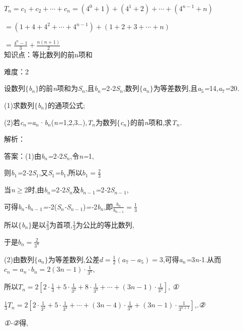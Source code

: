 \documentclass{article} %
\begin{document}
$T_n=c_1+c_2+\cdots+c_n=(4^0+1)+(4^1+2)+\cdots+(4^{n-1}+n)$

$=(1+4+4^2+\cdots+4^{n-1})+(1+2+3+\cdots+n)$

$=\frac{4^n-1}{3}+\frac{n(n+1)}{2}$ \\

知识点：等比数列的前n项和

难度：2

 设数列$\mathrm{\{}$\textit{b${}_{n}$}$\mathrm{\}}$的前\textit{n}项和为\textit{S${}_{n}$},且\textit{b${}_{n}$=}2\textit{-}2\textit{S${}_{n}$},数列$\mathrm{\{}$\textit{a${}_{n}$}$\mathrm{\}}$为等差数列,且\textit{a}${}_{5}$\textit{=}14,\textit{a}${}_{7}$\textit{=}20\textit{.}

 (1)求数列$\mathrm{\{}$\textit{b${}_{n}$}$\mathrm{\}}$的通项公式;

 (2)若\textit{c${}_{n}$=a${}_{n}$}·\textit{b${}_{n}$}(\textit{n=}1,2,3{\dots}),\textit{T${}_{n}$}为数列$\mathrm{\{}$\textit{c${}_{n}$}$\mathrm{\}}$的前\textit{n}项和,求\textit{T${}_{n}$.}

解析：

 答案：(1)由\textit{b${}_{n}$=}2\textit{-}2\textit{S${}_{n}$},令\textit{n=}1,

则\textit{b}${}_{1}$\textit{=}2\textit{-}2\textit{S}${}_{1}$,又\textit{S}${}_{1}$\textit{=b}${}_{1}$,所以$b_1=\frac{2}{3}$

当\textit{n}$\mathrm{\ge}$2时,由\textit{b${}_{n}$=}2\textit{-}2\textit{S${}_{n}$}及\textit{b${}_{n-}$}${}_{1}$\textit{=}2\textit{-}2\textit{S${}_{n-}$}${}_{1}$,

可得\textit{b${}_{n}$-b${}_{n-}$}${}_{1}$\textit{=-}2(\textit{S${}_{n}$-S${}_{n-}$}${}_{1}$)\textit{=-}2\textit{b${}_{n}$},即$\frac{b_n}{b_{n-1}}=\frac{1}{3}$

所以$\mathrm{\{}$\textit{b${}_{n}$}$\mathrm{\}}$是以$\frac{2}{3}$为首项,$\frac{1}{3}$为公比的等比数列,

于是$b_n=\frac{2}{3^n}$

(2)由数列$\mathrm{\{}$\textit{a${}_{n}$}$\mathrm{\}}$为等差数列,公差$d=\frac{1}{2}(a_7-a_5)=3$,可得\textit{a${}_{n}$=}3\textit{n-}1\textit{.}从而$c_n=a_n\cdot b_n=2(3n-1)\cdot \frac{1}{3^n}$,

所以$T_n=2[2\cdot \frac{1}{3}+5\cdot \frac{1}{3^2}+8\cdot \frac{1}{3^3}+\cdots +(3n-1)\cdot \frac{1}{3^n}]$,\textit{ ①}

$\frac{1}{3}T_n=2[2\cdot \frac{1}{3^2}+5\cdot \frac{1}{3^3}+\cdots +(3n-4)\cdot \frac{1}{3^n}+(3n-1)\cdot \frac{1}{3^{n+1}}]$,\textit{.②}

\textit{①-②}得,
\end{document}
